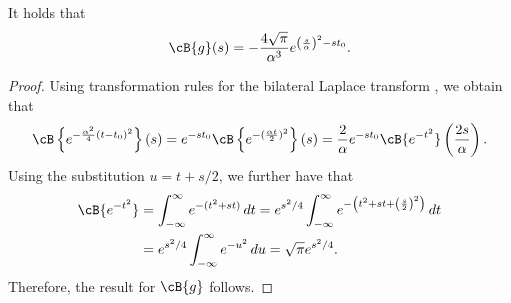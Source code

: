 \begin{lemma}\label{lem:bilateral_laplace_ricker}
It holds that
\begin{align}
	\cB\{g\}(s)
    = 
    -\frac{4\sqrt{\pi}}{\alpha^3} e^{\left(\frac{s}{\alpha}\right)^2-s t_0}.
\end{align}
\end{lemma}
\begin{proof}
Using transformation rules for the bilateral Laplace transform \cite[Table~14.1]{bracewell2000fourier},
we obtain that
\begin{align}
    \cB\left\{e^{-\frac{\alpha^2}{4}(t-t_0)^2}\right\}(s) 
    = 
    e^{-st_0}
    \cB
    \left\{
        e^{- (\frac{\alpha t}{2})^2}
    \right\}(s) 
    = 
    \frac{2}{\alpha}e^{-st_0}\cB\{e^{-t^2}\}\left(\frac{2s}{\alpha}\right).
\end{align}
Using the substitution $u=t+s/2$, we further have that
\begin{align}
    \cB\{e^{-t^2}\}&=\int_{-\infty}^\infty e^{-(t^2 + st)}\,dt 
    =e^{s^2/4} \int_{-\infty}^\infty e^{-\left(t^2 + st + \left(\frac{s}{2}\right)^2\right)}\,dt \\
&=e^{s^2/4} \int_{-\infty}^\infty e^{-u^2}\,du= \sqrt{\pi}e^{s^2/4}.
\end{align}
Therefore, the result for $\cB\{g\}$ follows. 
\end{proof}

